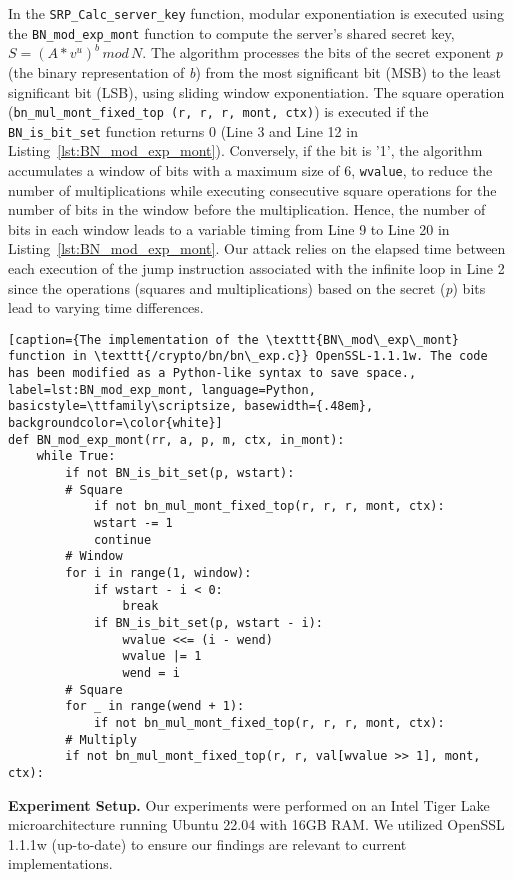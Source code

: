 In the \texttt{SRP\_Calc\_server\_key} function, modular exponentiation is executed using the \texttt{BN\_mod\_exp\_mont} function to compute the server's shared secret key, $S=(A*v^u)^b\,mod\, N$. The algorithm processes the bits of the secret exponent \textit{p} (the binary representation of \textit{b}) from the most significant bit (MSB) to the least significant bit (LSB), using sliding window exponentiation. The square operation (\texttt{bn\_mul\_mont\_fixed\_top (r, r, r, mont, ctx)}) is executed if the \texttt{BN\_is\_bit\_set} function returns 0 (Line 3 and Line 12 in Listing~\ref{lst:BN_mod_exp_mont}). Conversely, if the bit is '1', the algorithm accumulates a window of bits with a maximum size of 6, \texttt{wvalue}, to reduce the number of multiplications while executing consecutive square operations for the number of bits in the window before the multiplication. Hence, the number of bits in each window leads to a variable timing from Line 9 to Line 20 in Listing~\ref{lst:BN_mod_exp_mont}. Our attack relies on the elapsed time between each execution of the jump instruction associated with the infinite loop in Line 2 since the operations (squares and multiplications) based on the secret (\textit{p}) bits lead to varying time differences. 
\begin{lstlisting}[caption={The implementation of the \texttt{BN\_mod\_exp\_mont} function in \texttt{/crypto/bn/bn\_exp.c}} OpenSSL-1.1.1w. The code has been modified as a Python-like syntax to save space., label=lst:BN_mod_exp_mont, language=Python, basicstyle=\ttfamily\scriptsize, basewidth={.48em}, backgroundcolor=\color{white}]
def BN_mod_exp_mont(rr, a, p, m, ctx, in_mont):
    while True:
        if not BN_is_bit_set(p, wstart):
        # Square
            if not bn_mul_mont_fixed_top(r, r, r, mont, ctx): 
            wstart -= 1
            continue
        # Window 
        for i in range(1, window):
            if wstart - i < 0:
                break
            if BN_is_bit_set(p, wstart - i):
                wvalue <<= (i - wend)
                wvalue |= 1
                wend = i
        # Square
        for _ in range(wend + 1):
            if not bn_mul_mont_fixed_top(r, r, r, mont, ctx): 
        # Multiply
        if not bn_mul_mont_fixed_top(r, r, val[wvalue >> 1], mont, ctx):
\end{lstlisting}


\noindent\textbf{Experiment Setup.} Our experiments were performed on an Intel Tiger Lake microarchitecture running Ubuntu 22.04 with 16GB RAM. We utilized OpenSSL 1.1.1w (up-to-date) to ensure our findings are relevant to current implementations. 

